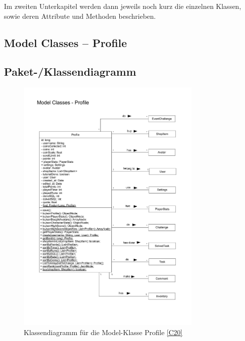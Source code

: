 Im zweiten Unterkapitel werden dann jeweils noch kurz die einzelnen Klassen, sowie deren Attribute und Methoden beschrieben.

\clearpage


\newpage


\subsection{Model Classes -- Profile}
\subsection{Paket-/Klassendiagramm}
\begin{figure}[h!]
\centering
\includegraphics[width=0.8\textwidth]{figures/KDProfile}
\caption{Klassendiagramm für die Model-Klasse Profile \ref{C20}}
\label{classC10}
\end{figure}
\clearpage
